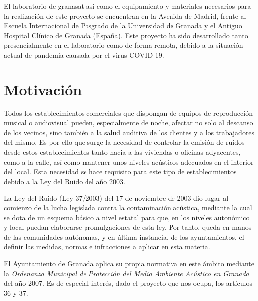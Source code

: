 El laboratorio de \gls{granasat} así como el equipamiento y materiales necesarios para la realización de este proyecto se encuentran en la Avenida de Madrid, frente al Escuela Internacional de Posgrado de la Universidad de Granada y el Antiguo Hospital Clínico de Granada (España). Este proyecto ha sido desarrollado tanto presencialmente en el laboratorio como de forma remota, debido a la situación actual de pandemia causada por el virus COVID-19.


\section{Motivación}\label{sec:motivacion}


Todos los establecimientos comerciales que dispongan de equipos de reproducción musical o audiovisual pueden, especialmente de noche, afectar no solo al descanso de los vecinos, sino también a la salud auditiva de los clientes y a los trabajadores del mismo. Es por ello que surge la necesidad de controlar la emisión de ruidos desde estos establecimientos tanto hacia a las viviendas o oficinas adyacentes, como a la calle, así como mantener unos niveles acústicos adecuados en el interior del local. Esta necesidad se hace requisito para este tipo de establecimientos debido a la Ley del Ruido del año 2003.

La Ley del Ruido (Ley 37/2003) del 17 de noviembre de 2003 dio lugar al comienzo de la lucha legislada contra la contaminación acústica, mediante la cual se dota de un esquema básico a nivel estatal para que, en los niveles autonómico y local puedan elaborarse promulgaciones de esta ley. Por tanto, queda en manos de las comunidades autónomas, y en última instancia, de los ayuntamientos, el definir las medidas, normas e infracciones a aplicar en esta materia.

El Ayuntamiento de Granada aplica su propia normativa en este ámbito mediante la \textit{Ordenanza Municipal de Protección del Medio Ambiente Acústico en Granada} del año 2007. Es de especial interés, dado el proyecto que nos ocupa, los artículos 36 y 37.

